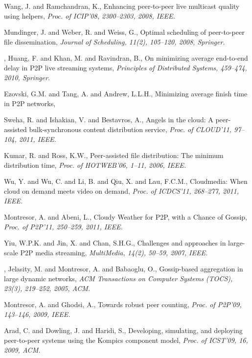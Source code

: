 {\begin{thebibliography}{5}
Wang, J. and Ramchandran, K.,
\newblock Enhancing peer-to-peer live multicast quality using helpers,
\newblock \emph{Proc. of ICIP'08, 2300--2303, 2008, IEEE.}

Mundinger, J. and Weber, R. and Weiss, G.,
\newblock Optimal scheduling of peer-to-peer file dissemination,
\newblock \emph{Journal of Scheduling, 11(2), 105--120, 2008, Springer.}

,
Huang, F. and Khan, M. and Ravindran, B.,
\newblock On minimizing average end-to-end delay in {P2P} live streaming systems,
\newblock \emph{Principles of Distributed Systems, 459--474, 2010, Springer.}

Ezovski, G.M. and Tang, A. and Andrew, L.L.H.,
\newblock Minimizing average finish time in {P2P} networks,

Sweha, R. and Ishakian, V. and Bestavros, A.,
\newblock Angels in the cloud: A peer-assisted bulk-synchronous content distribution service,
\newblock \emph{Proc. of CLOUD'11, 97--104, 2011, IEEE.}

Kumar, R. and Ross, K.W.,
\newblock Peer-assisted file distribution: The minimum distribution time,
\newblock \emph{Proc. of HOTWEB'06, 1--11, 2006, IEEE.}

Wu, Y. and Wu, C. and Li, B. and Qiu, X. and Lau, F.C.M.,
\newblock Cloudmedia: When cloud on demand meets video on demand,
\newblock \emph{Proc. of ICDCS'11, 268--277, 2011, IEEE.}

Montresor, A. and Abeni, L.,
\newblock Cloudy Weather for {P2P}, with a Chance of Gossip,
\newblock \emph{Proc. of P2P'11, 250--259, 2011, IEEE.}

Yiu, W.P.K. and Jin, X. and Chan, S.H.G.,
\newblock Challenges and approaches in large-scale {P2P} media streaming,
\newblock \emph{MultiMedia, 14(2), 50--59, 2007, IEEE.}

,
Jelasity, M. and Montresor, A. and Babaoglu, O.,
\newblock Gossip-based aggregation in large dynamic networks,
\newblock \emph{ACM Transactions on Computer Systems (TOCS), 23(3), 219--252, 2005, ACM.}

Montresor, A. and Ghodsi, A.,
\newblock Towards robust peer counting,
\newblock \emph{Proc. of P2P'09, 143--146, 2009, IEEE.}

Arad, C. and Dowling, J. and Haridi, S.,
\newblock Developing, simulating, and deploying peer-to-peer systems using the {Kompics} component model,
\newblock \emph{Proc. of ICST'09, 16, 2009, ACM.}


\end{thebibliography}}
